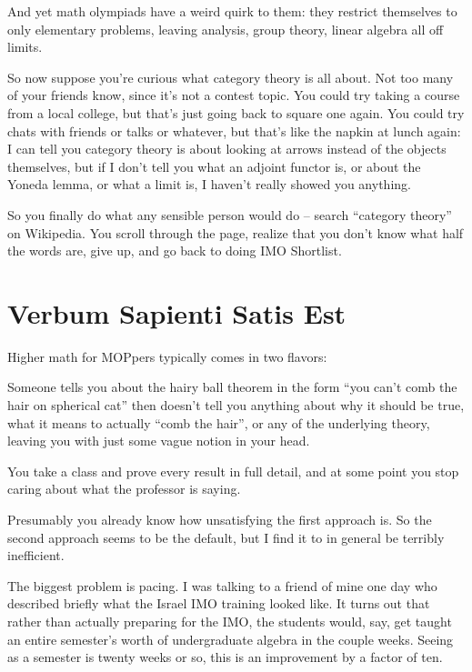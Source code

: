 And yet math olympiads have a weird quirk to them: they restrict themselves to only elementary problems, leaving analysis, group theory, linear algebra all off limits.

So now suppose you're curious what category theory is all about.
Not too many of your friends know, since it's not a contest topic.
You could try taking a course from a local college, but that's just going back to square one again.
You could try chats with friends or talks or whatever, but that's like the napkin at lunch again: I can tell you category theory is about looking at arrows instead of the objects themselves, but if I don't tell you what an adjoint functor is, or about the Yoneda lemma, or what a limit is, I haven't really showed you anything.

So you finally do what any sensible person would do -- search ``category theory'' on Wikipedia.
You scroll through the page, realize that you don't know what half the words are, give up, and go back to doing IMO Shortlist.




\section*{Verbum Sapienti Satis Est}
Higher math for MOPpers typically comes in two flavors:
\begin{itemize}
	\ii Someone tells you about the hairy ball theorem in the form ``you can't comb the hair on spherical cat''
	then doesn't tell you anything about why it should be true, what it means to actually ``comb the hair'', 
	or any of the underlying theory, leaving you with just some vague notion in your head.

	\ii You take a class and prove every result in full detail, and at some point
	you stop caring about what the professor is saying.
\end{itemize}
Presumably you already know how unsatisfying the first approach is.
So the second approach seems to be the default, but I find it to in general be terribly inefficient.

The biggest problem is pacing.
I was talking to a friend of mine one day who described briefly
what the Israel IMO training looked like.
It turns out that rather than actually preparing for the IMO,
the students would, say, get taught an entire semester's worth of
undergraduate algebra in the couple weeks.
Seeing as a semester is twenty weeks or so, this is an improvement
by a factor of ten.

